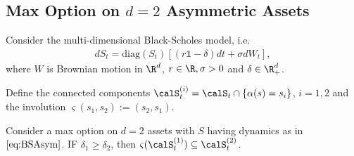 
\subsection{Max Option on $d=2$ Asymmetric Assets}\label{sec:maxCallAsym}
Consider the multi-dimensional Black-Scholes model, i.e. 
\begin{align}\label{eq:BSAsym}
    d S_t = \text{diag}(S_t) \left[ (r\mathds{1} - \delta)dt + \sigma dW_t\right],
\end{align}
where $W$ is Brownian motion in $\R^d$, $r \in \R ,\sigma > 0$ and $\delta \in \R_+^d$. 

Define the connected components $\calS^{(i)}_t = \calS_t \cap \{\alpha(s) = s_i\}$, $i=1,2$ and the involution   $\varsigma(s_1,s_2) := (s_2,s_1)$.  

\begin{proposition} Consider a max option on $d=2$ assets with $S$ having dynamics as in $\eqref{eq:BSAsym}$. IF $\delta_1 \ge \delta_2$, then $\varsigma(\calS^{(1)}_t) \subseteq \calS^{(2)}_t$. 
\end{proposition}

